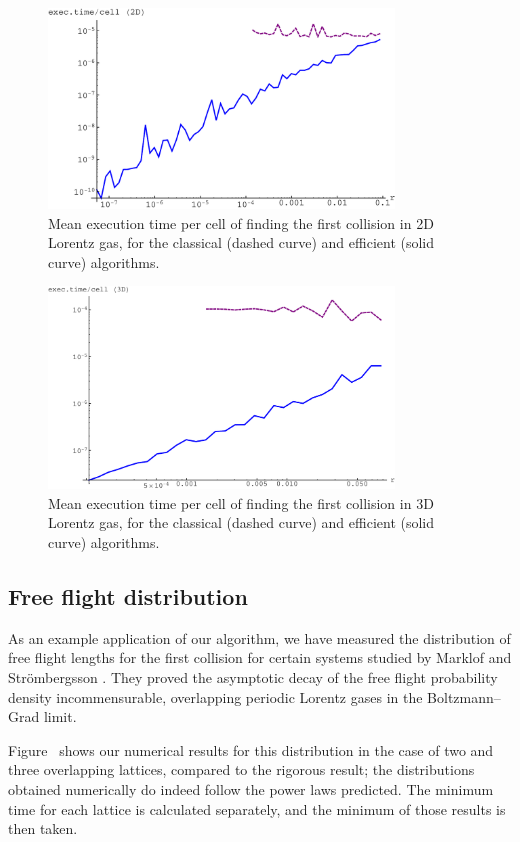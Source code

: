 \documentclass[pre,amsmath,amssymb, twocolumn, showpacs]{revtex4-1}
\begin{document}
\begin{figure}
\centering
\includegraphics [width=260pt]{exectimepercell-2D.pdf}
\caption{Mean execution time per cell of finding the first collision in 2D Lorentz gas, for the classical (dashed curve) and efficient (solid curve) algorithms.}
\label{fig:exectimepercell2D}
\end{figure}

\begin{figure}
\centering
\includegraphics [width=260pt]{exectimepercell-3D.pdf}
\caption{Mean execution time per cell of finding the first collision in 3D Lorentz gas, for the classical (dashed curve) and efficient (solid curve) algorithms.}
\label{fig:exectimepercell3D}
\end{figure}

\subsection{Free flight distribution}
As an example application of our algorithm, we have measured the distribution of free flight lengths for the first collision for certain systems studied by Marklof and Str\"ombergsson \cite{marklof2014power}. They proved the asymptotic decay of the free flight probability density incommensurable, overlapping periodic Lorentz gases in the Boltzmann--Grad limit. 

Figure~ shows our numerical results for this distribution in the case of two and three overlapping lattices, compared to the rigorous result; the distributions obtained numerically do indeed follow the power laws predicted. The minimum time for each lattice is calculated separately, and the minimum of those results is then taken.
\end{document}
